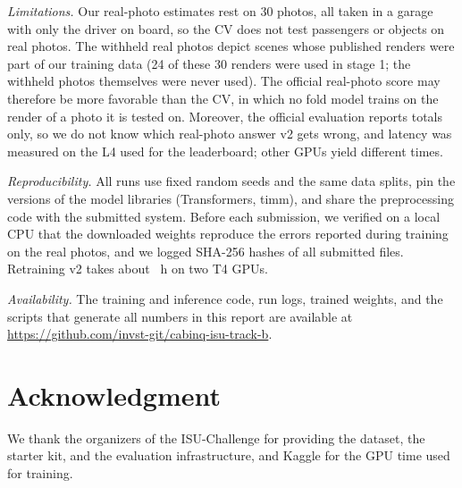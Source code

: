 \documentclass[10pt,conference]{IEEEtran}
\begin{document}
\emph{Limitations.} Our real-photo estimates rest on 30 photos, all taken in a garage with only the driver on board, so the CV does not test passengers or objects on real photos. The withheld real photos depict scenes whose published renders were part of our training data (24 of these 30 renders were used in stage 1; the withheld photos themselves were never used). The official real-photo score may therefore be more favorable than the CV, in which no fold model trains on the render of a photo it is tested on. Moreover, the official evaluation reports totals only, so we do not know which real-photo answer v2 gets wrong, and latency was measured on the L4 used for the leaderboard; other GPUs yield different times.

\emph{Reproducibility.} All runs use fixed random seeds and the same data splits, pin the versions of the model libraries (Transformers, timm), and share the preprocessing code with the submitted system. Before each submission, we verified on a local CPU that the downloaded weights reproduce the errors reported during training on the real photos, and we logged SHA-256 hashes of all submitted files. Retraining v2 takes about \vTwoTrainH{}~h on two T4 GPUs.

\emph{Availability.} The training and inference code, run logs, trained weights, and the scripts that generate all numbers in this report are available at \url{https://github.com/invst-git/cabinq-isu-track-b}.

\section*{Acknowledgment}
We thank the organizers of the ISU-Challenge for providing the dataset, the starter kit, and the evaluation infrastructure, and Kaggle for the GPU time used for training.



\end{document}
